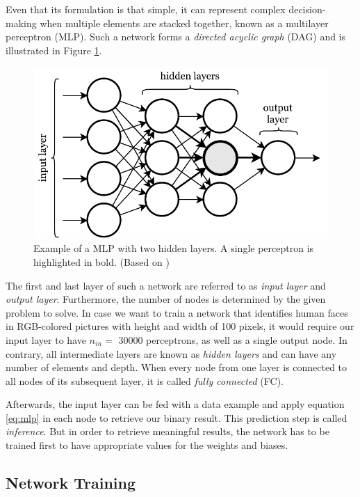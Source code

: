 Even that its formulation is that simple, it can represent complex decision-making when multiple elements are stacked together, known as a multilayer perceptron (MLP). Such a network forms a \textit{directed acyclic graph} (DAG) and is illustrated in Figure \ref{fig:mlp}.

\begin{figure}[htpb]
	\centering
	\includegraphics[width=.75\linewidth]{figures/mlp.pdf}
	\caption[Multilayer Perceptron]{Example of a MLP with two hidden layers. A single perceptron is highlighted in bold. (Based on \parencite{neural_nets_deep_learning})} \label{fig:mlp}
\end{figure}

The first and last layer of such a network are referred to as \textit{input layer} and \textit{output layer}. Furthermore, the number of nodes is determined by the given problem to solve. In case we want to train a network that identifies human faces in RGB-colored pictures with height and width of 100 pixels, it would require our input layer to have $ n_{in}=$ \num{30000} perceptrons, as well as a single output node. In contrary, all intermediate layers are known as \textit{hidden layers} and can have any number of elements and depth. When every node from one layer is connected to all nodes of its subsequent layer, it is called \textit{fully connected} (FC).

Afterwards, the input layer can be fed with a data example and apply equation \ref{eq:mlp} in each node to retrieve our binary result. This prediction step is called \textit{inference}. But in order to retrieve meaningful results, the network has to be trained first to have appropriate values for the weights and biases.

\subsection{Network Training}


